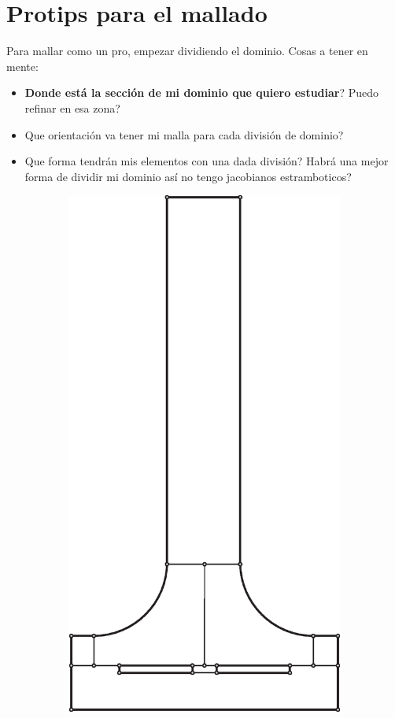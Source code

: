 \documentclass[11pt, a4paper,titlepage]{article}
\begin{document}
\section{Protips para el mallado}
Para mallar como un pro, empezar dividiendo el dominio. Cosas a tener en mente:
\begin{itemize}
	\item \textbf{Donde está la sección de mi dominio que quiero estudiar}? Puedo refinar en esa zona?
	\item Que orientación va tener mi malla para cada división de dominio?
	\item Que forma tendrán mis elementos con una dada división? Habrá una mejor forma de dividir mi dominio así no tengo jacobianos estramboticos?
\end{itemize}


\begin{figure}[htb!]
	\centering
	\begin{subfigure}{0.49\textwidth}
		\centering
		\includegraphics[width=.7\linewidth]{fig/divisionPelton1.eps}

\end{subfigure}
\end{figure}
\end{document}
